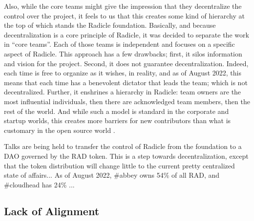 Also, while the core teams might give the impression that they decentralize the control over the project, it feels to us that this creates some kind of hierarchy%
 at the top of which stands the Radicle foundation.
Basically, and because decentralization is a core principle of Radicle, it was decided to separate the work in \enquote{core teams}.
Each of those teams is independent and focuses on a specific aspect of Radicle.
This approach has a few drawbacks; first, it silos information and vision for the project.
Second, it does not guarantee decentralization.
Indeed, each time is free to organize as it wishes, in reality, and as of August 2022, this means that each time has a benevolent dictator that leads the team; which is not decentralized.
Further, it enshrines a hierarchy in Radicle: team owners are the most influential individuals, then there are acknowledged team members, then the rest of the world.
And while such a model is standard in the corporate and startup worlds, this creates more barriers for new contributors than what is customary in the open source world%
.

Talks are being held to transfer the control of Radicle from the foundation to a DAO governed by the RAD token.
This is a step towards decentralization, except that the token distribution will change little to the current pretty centralized state of affairs...
As of August 2022, \#abbey owns 54\% of all RAD, and \#cloudhead has 24\% \cite{noauthor_sybil_nodate}...

\subsection{Lack of Alignment}


